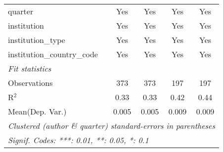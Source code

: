 \begin{tabular}{lcccc}
   quarter                                  & Yes     & Yes     & Yes     & Yes\\  
   institution                              & Yes     & Yes     & Yes     & Yes\\  
   institution\_type                        & Yes     & Yes     & Yes     & Yes\\  
   institution\_country\_code               & Yes     & Yes     & Yes     & Yes\\  
   \midrule
   \emph{Fit statistics}\\
   Observations                             & 373     & 373     & 197     & 197\\  
   R$^2$                                    & 0.33    & 0.33    & 0.42    & 0.44\\  
Mean(Dep. Var.) & 0.005 & 0.005 & 0.009 & 0.009 \\
   \midrule \midrule
   \multicolumn{5}{l}{\emph{Clustered (author \& quarter) standard-errors in parentheses}}\\
   \multicolumn{5}{l}{\emph{Signif. Codes: ***: 0.01, **: 0.05, *: 0.1}}\\
\end{tabular}
\par\endgroup
